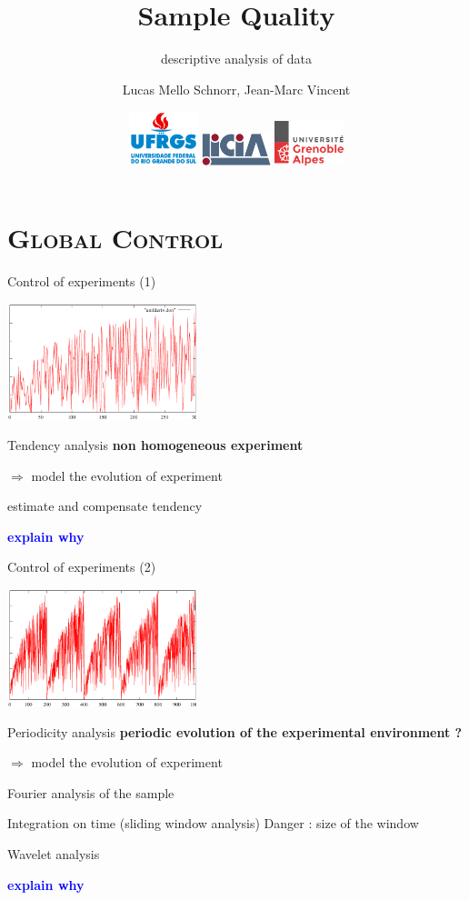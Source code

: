 \documentclass[xcolor=x11names,compress,8pt,
handout
]{beamer}
\title[Data Characterization] %
{Sample Quality}
\subtitle{descriptive analysis of data}
\author%
{		
Lucas Mello Schnorr, Jean-Marc Vincent
}
\institute[LICIA] %
{%
{\large INF/UFRGS\\
Porto Alegre, Brazil – October 30th, 2017}
}
\date[Porto Alegre 2017] %
{
\includegraphics[width=2cm]{logos/ufrgs2.png}\hfill
\includegraphics[width=2cm]{logos/licia-small.png}\hfill
\includegraphics[width=2cm]{logos/uga.png}
}
\renewcommand{\(}{\begin{columns}}
\renewcommand{\)}{\end{columns}}
\newcommand{\<}[1]{\begin{column}{#1}}
\renewcommand{\>}{\end{column}}
\begin{document}
\begin{frame}
\titlepage
\end{frame}
\section[{\scshape Global Control}]{{\scshape Global Control}}

\begin{frame}{Control of experiments (1)}
\begin{center}
\includegraphics[width=5.5cm]{CE-unifderiv.pdf}
\end{center}
\pause
\begin{block}{Tendency analysis}
\alert{\bf non homogeneous experiment}

$\Rightarrow$ model the evolution of experiment

estimate and compensate tendency

\textcolor{blue}{\bf explain why}
\end{block}
\end{frame}
\begin{frame}{Control of experiments (2)}
\begin{center}
\includegraphics[width=5.5cm]{CE-periode.pdf}
\end{center}
\pause
\begin{block}{Periodicity analysis}
\alert{\bf periodic evolution of the experimental environment ?}

$\Rightarrow$ model the evolution of experiment

Fourier analysis of the sample

Integration on time (sliding window analysis) Danger : size of the window

Wavelet analysis

\textcolor{blue}{\bf explain why}
\end{block}
\end{frame}
\end{document}
